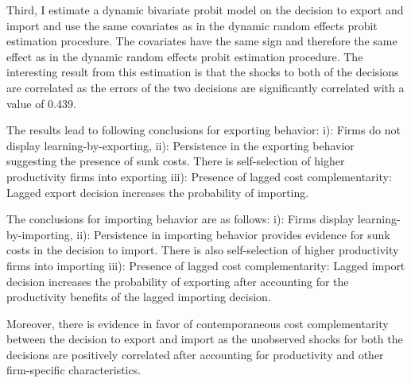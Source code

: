 \documentclass[12pt]{article}
\begin{document}
Third, I estimate a dynamic bivariate probit model  on the
decision to export and import and use the same covariates as in the
dynamic random effects probit estimation procedure. The covariates
have the same sign and therefore the same effect as in the dynamic
random effects probit estimation procedure.
The interesting result from this estimation is that the shocks to both
of the decisions are
correlated as the  errors of the two decisions are
significantly correlated with a value of 0.439.   %




The results lead to following conclusions for exporting behavior:
i): Firms do not display learning-by-exporting,
ii): Persistence in the exporting behavior suggesting the presence of
sunk costs.  There is 
  self-selection of higher productivity firms into
   exporting  
iii):  Presence of lagged cost complementarity: Lagged export
decision increases the probability of importing.

The conclusions for importing behavior are as follows:
i): Firms  display learning-by-importing,
ii): Persistence in importing behavior provides evidence for
sunk costs in the decision to import. There is also self-selection of higher productivity firms into
   importing
iii):  Presence of lagged cost complementarity: Lagged import decision
increases the probability of exporting after accounting for the
productivity benefits of the lagged importing decision. 

Moreover, there is evidence in favor of contemporaneous cost complementarity between the
decision to export and import as  the unobserved shocks for both the
decisions are positively
correlated after accounting for productivity and other firm-specific
characteristics. 

\end{document}
